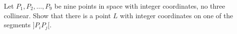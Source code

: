 Let $P_1, P_2, \ldots, P_9$ be nine points in space with integer coordinates, no three collinear. Show that there is a point $L$ with integer coordinates on one of the segments $]P_iP_j[$.
